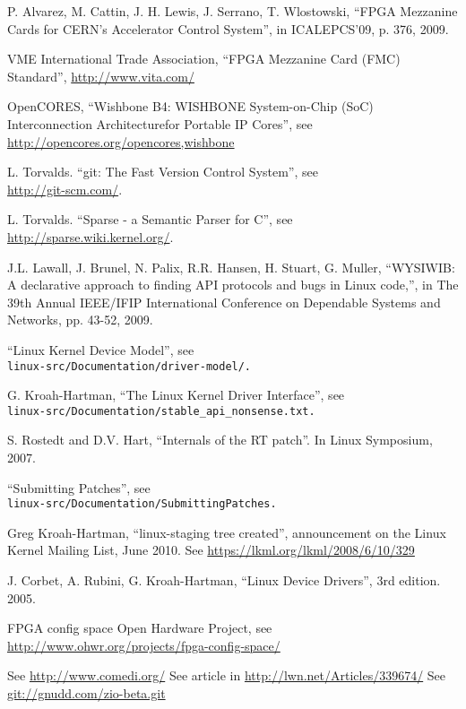 \documentclass{JAC2003}
\begin{document}
\begin{thebibliography}{9}   %

P. Alvarez, M. Cattin, J. H. Lewis, J. Serrano, T. Wlostowski,
``FPGA Mezzanine Cards for CERN’s Accelerator Control System'',
in ICALEPCS'09, p. 376, 2009.

VME International Trade Association,
``FPGA Mezzanine Card (FMC) Standard'', \url{http://www.vita.com/}

OpenCORES,
``Wishbone B4: WISHBONE System-on-Chip (SoC) Interconnection
Architecturefor Portable IP Cores'',
see \url{http://opencores.org/opencores,wishbone}

L. Torvalds. ``git: The Fast Version Control System'', see\\
\url{http://git-scm.com/}.

L. Torvalds. ``Sparse - a Semantic Parser for C'', see\\
\url{http://sparse.wiki.kernel.org/}.

J.L. Lawall, J. Brunel, N. Palix, R.R. Hansen, H. Stuart, G. Muller,
``WYSIWIB: A declarative approach to finding API protocols and bugs in
Linux code,'', in The 39th Annual IEEE/IFIP International Conference on
Dependable Systems and Networks, pp. 43-52, 2009.

``Linux Kernel Device Model'', see\\
\texttt{linux-src/Documentation/driver-model/.}

G. Kroah-Hartman, ``The Linux Kernel Driver Interface'', see\\
\texttt{linux-src/Documentation/stable\_api\_nonsense.txt.}

S. Rostedt and D.V. Hart, ``Internals of the RT patch''. In Linux
Symposium, 2007.

``Submitting Patches'', see\\
\texttt{linux-src/Documentation/SubmittingPatches.}

Greg Kroah-Hartman, ``linux-staging tree created'', announcement on the
Linux Kernel Mailing List, June 2010.
See \url{https://lkml.org/lkml/2008/6/10/329}

J. Corbet, A. Rubini, G. Kroah-Hartman, ``Linux Device Drivers'', 3rd
edition. 2005.

 FPGA config space Open Hardware
Project, see
\url{http://www.ohwr.org/projects/fpga-config-space/}

 See \url{http://www.comedi.org/}
 See article in \url{http://lwn.net/Articles/339674/}
 See \url{git://gnudd.com/zio-beta.git}

\end{thebibliography}
\end{document}

